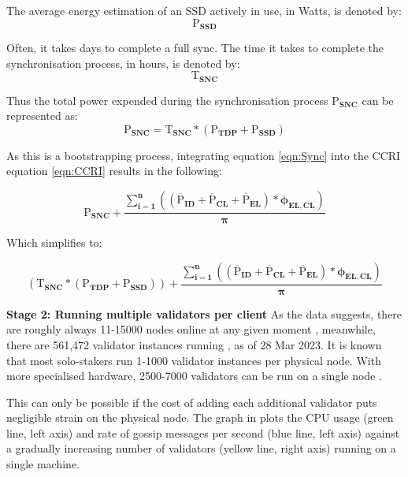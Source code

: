  The average energy estimation of an SSD actively in use, in Watts, is denoted by:
 \begin{equation*}
    \boldsymbol{\mathrm{P}_{SSD}} 
\end{equation*}

Often, it takes days to complete a full sync. The time it takes to complete the synchronisation process, in hours, is denoted by:
\begin{equation*}
    \boldsymbol{\mathrm{T}_{SNC}}
\end{equation*}

Thus the total power expended during the synchronisation process $\boldsymbol{\mathrm{P}_{SNC}}$ can be represented as:
\begin{equation}
    \boldsymbol{\mathrm{P}_{SNC} = \mathrm{T}_{SNC} * \left({\mathrm{P}_{TDP}} + \mathrm{P}_{SSD}\right)} \label{eqn:Sync}
\end{equation}

As this is a bootstrapping process, integrating equation \ref{eqn:Sync} into the CCRI equation \ref{eqn:CCRI} results in the following:

\begin{equation*}
    \boldsymbol{\mathrm{P}_{SNC} +  {\frac{\displaystyle\sum\limits_{i=1}^{n}{ \left({\left(\mathrm{\overline{P}}_{ID} + \mathrm{\overline{P}}_{CL} + \mathrm{\overline{P}}_{EL}\right)} * {\phi_{EL,CL}} \right)}}
 {\pi}} } 
\end{equation*}

Which simplifies to:

\begin{equation}
     \boldsymbol{\left({\mathrm{T}_{SNC} * \left({\mathrm{P}_{TDP}} + \mathrm{P}_{SSD}\right)}\right) +  {\frac{\displaystyle\sum\limits_{i=1}^{n}{ \left({\left(\mathrm{\overline{P}}_{ID} + \mathrm{\overline{P}}_{CL} + \mathrm{\overline{P}}_{EL}\right)} * {\phi_{EL,CL}} \right)}}
{\pi}} } \label{eqn:CCRISync}
\end{equation}

\textbf{ Stage 2: Running multiple validators per client}
As the data suggests, there are roughly always 11-15000 nodes online at any given moment \cite{NodewatchAnalytics}, meanwhile, there are 561,472 validator instances running \cite{EthereumEthereum.orgc}, as of 28 Mar 2023. It is known that most solo-stakers run 1-1000 validator instances per physical node. With more specialised hardware, 2500-7000 validators can be run on a single node \cite{Kaushal2022ValidatingConference}. 

This can only be possible if the cost of adding each additional validator puts negligible strain on the physical node. The graph in  \cite{Sutton2022ExploringSymphonious} plots the CPU usage (green line, left axis) and rate of gossip messages per second (blue line, left axis) against a gradually increasing number of validators (yellow line, right axis) running on a single machine.


